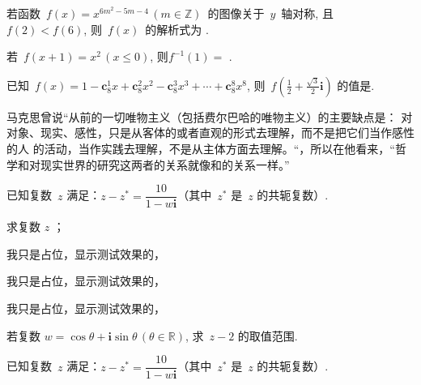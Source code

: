 \documentclass[a4paper, zihao = 5, unicodeGBMath, %
]{ctexart}
\begin{document}

\begin{qus}
  
\item 若函数~$f(x)=x^{6m^2-5m-4}\,(m\in\mathbb{Z})$~的图像关于~$y$~轴对称,
  且~$f(2)<f(6)$, 则~$f(x)$~的解析式为 .

\item 若~$f(x+1)=x^2\,(x\leq0)$, 则$f^{-1}(1)=$ .

\item 已知~$f(x)=1-\textbf{c}_8^1x+\textbf{c}_8^2x^2-\textbf{c}_8^3x^3+\cdots+\textbf{c}_8^8x^8$,
  则~$f\left(\tfrac{1}{2}+\tfrac{\sqrt{3}}{2}\textbf{i}\right)$ 的值是.

\item 马克思曾说“从前的一切唯物主义（包括费尔巴哈的唯物主义）的主要缺点是：
  对对象、现实、感性，只是从客体的或者直观的形式去理解，而不是把它们当作感性的人
  的活动，当作实践去理解，不是从主体方面去理解。“，所以在他看来，“哲学和对现实世界的研究这两者的关系就像和的关系一样。”

\end{qus}


\begin{qus}
  
\item 已知复数~$z$ 满足：${z}-z^*=\dfrac{10}{1-w\textbf{i}}$（其中~$z^*$
  是~$z$ 的共轭复数）.

  \begin{qus}
  \item 求复数 $z$ ；
    \begin{qus}
    \item 我只是占位，显示测试效果的，
    \item 我只是占位，显示测试效果的，
    \item 我只是占位，显示测试效果的，
    \end{qus}
  \item 若复数 $w=\cos\theta+\textbf{i}\sin\theta\,(\theta\in\mathbb{R})$, 求~${z-2}$ 的取值范围.
  \end{qus}


  \vspace{7cm}


\item 已知复数~$z$ 满足：${z}-z^*=\dfrac{10}{1-w\textbf{i}}$（其中~$z^*$
  是~$z$ 的共轭复数）.

  \solution{}

  \vspace{4cm}
\end{qus}
\end{document}
